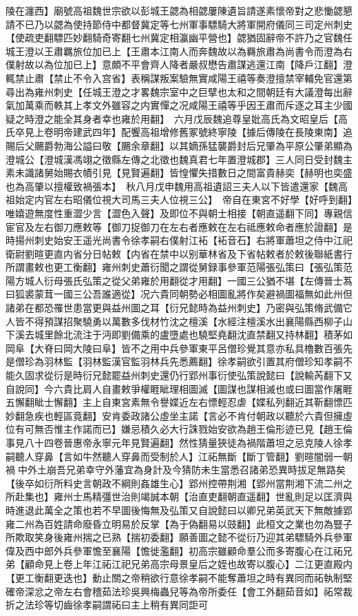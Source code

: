 陵在瀍西】廟號高祖魏世宗欲以彭城王勰為相勰屢陳遺旨請遂素懷帝對之悲慟勰懇請不已乃以勰為使持節侍中都督冀定等七州軍事驃騎大將軍開府儀同三司定州刺史【使疏吏翻驃匹妙翻騎奇寄翻七州冀定相瀛幽平營也】勰猶固辭帝不許乃之官魏任城王澄以王肅羈旅位加已上【王肅本江南人而奔魏故以為羇旅肅為尚書令而澄為右僕射故以為位加已上】意頗不平會齊人降者嚴叔懋告肅謀逃還江南【降戶江翻】澄輒禁止肅【禁止不令入宫省】表稱謀叛案驗無實咸陽王禧等奏澄擅禁宰輔免官還第尋出為雍州刺史【任城王澄之才畧魏宗室中之巨擘也太和之間朝廷有大議澄每出辭氣加萬乘而軼其上孝文外雖容之内實憚之况咸陽王禧等乎因王肅而斥逐之耳主少國疑之時澄之能全其身者幸也雍於用翻】　六月戊辰魏追尊皇妣高氏為文昭皇后【高氏卒見上卷明帝建武四年】配饗高祖增修舊冢號終寧陵【據后傳陵在長陵東南】追賜后父颺爵勃海公謚曰敬【颺余章翻】以其嫡孫猛襲爵封后兄肇為平原公肇弟顯為澄城公【澄城漢馮翊之徵縣左傳之北徵也魏真君七年置澄城郡】三人同日受封魏主素未識諸舅始賜衣幘引見【見賢遍翻】皆惶懼失措數日之間富貴赫奕【赫明也奕盛也為高肇以擅權致禍張本】　秋八月戊申魏用高祖遺詔三夫人以下皆遣還家【魏高祖始定内官左右昭儀位視大司馬三夫人位視三公】　帝自在東宮不好學【好呼到翻】唯嬉遊無度性重澀少言【澀色入聲】及即位不與朝士相接【朝直遥翻下同】專親信宦官及左右御刀應敕等【御刀捉御刀在左右者應敕在左右祗應敕命者應於證翻】是時揚州刺史始安王遥光尚書令徐孝嗣右僕射江袥【袥音石】右將軍蕭坦之侍中江祀衛尉劉暄更直内省分日帖敕【内省在禁中以别華林省及下省帖敕者於敕後聯紙書行所謂畫敕也更工衡翻】雍州刺史蕭衍聞之謂從舅録事參軍范陽張弘策曰【張弘策范陽方城人衍母張氏弘策之從父弟雍於用翻從才用翻】一國三公猶不堪【左傳晉士蒍曰狐裘蒙茸一國三公吾誰適從】况六貴同朝勢必相圖亂將作矣避禍圖福無如此州但諸弟在都恐罹世患當更與益州圖之耳【衍兄懿時為益州刺史】乃密與弘策脩武備它人皆不得預謀招聚驍勇以萬數多伐材竹沈之檀溪【水經注檀溪水出襄陽縣西柳子山下溪去城里餘北流注于沔即劉備乘的盧墮處也驍堅堯翻沈直禁翻又持林翻】積茅如岡阜【大脊曰岡大陵曰阜】皆不之用中兵參軍東平呂僧珍覺其意亦私具櫓數百張先是僧珍為羽林監【羽林監漢官監羽林兵先悉薦翻】徐孝嗣欲引置其府僧珍知孝嗣不能久固求從衍是時衍兄懿罷益州刺史還仍行郢州事衍使弘策說懿曰【說輸芮翻下又自說同】今六貴比肩人自畫敕爭權睚眦理相圖滅【圖謀也謀相滅也或曰圖當作屠睚五懈翻眦士懈翻】主上自東宮素無令譽媟近左右慓輕忍虐【媟私列翻近其靳翻慓匹妙翻急疾也輕區竟翻】安肯委政諸公虛坐主諾【言必不肯付朝政以聽於六貴但擁虛位有可無否惟主作諾而已】嫌忌積久必大行誅戮始安欲為趙王倫形迹已見【趙王倫事見八十四卷晉惠帝永寧元年見賢遍翻】然性猜量狹徒為禍階蕭坦之忌克陵人徐孝嗣聽人穿鼻【言如牛然聽人穿鼻而受制於人】江祏無斷【斷丁管翻】劉暄闇弱一朝禍中外土崩吾兄弟幸守外藩宜為身計及今猜防未生當悉召諸弟恐異時拔足無路矣【後卒如衍所料史言朝政不綱則姦雄生心】郢州控帶荆湘【郢州當荆湘下流二州之所赴集也】雍州士馬精彊世治則竭誠本朝【治直吏翻朝直遥翻】世亂則足以匡濟與時進退此萬全之策也若不早圖後悔無及弘策又自說懿曰以卿兄弟英武天下無敵據郢雍二州為百姓請命廢昏立明易於反掌【為于偽翻易以豉翻】此桓文之業也勿為豎子所欺取笑身後雍州揣之已熟【揣初委翻】願善圖之懿不從衍乃迎其弟驃騎外兵參軍偉及西中郎外兵參軍憺至襄陽【憺徙濫翻】初高宗雖顧命羣公而多寄腹心在江祏兄弟【顧命見上卷上年江祏江祀兄弟高宗母景皇后之姪也故寄以腹心】二江更直殿内【更工衡翻更迭也】動止關之帝稍欲行意徐孝嗣不能奪蕭坦之時有異同而祏執制堅確帝深忿之帝左右會稽茹法珍吳興梅蟲兒等為帝所委任【會工外翻茹音如】祏常裁折之法珍等切齒徐孝嗣謂祏曰主上稍有異同詎可
